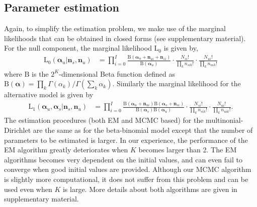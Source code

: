 \documentclass[11pt]{article}
\begin{document}
\subsection{Parameter estimation}
Again, to simplify the estimation problem, we make use of the marginal likelihoods that can be obtained in closed forms (see supplementary material). For the null component, the marginal likelihood $\mathrm{L}_0$ is given by,
\begin{align}
\mathrm{L}_0(\boldsymbol{\alpha}_u|\mathbf{n}_s,\mathbf{n}_u) &= \prod_{i=0}^I\frac{ \mathrm{B}(\boldsymbol{\alpha}_{u}+\mathbf{n}_{ui}+\mathbf{n}_{si})}{\mathrm{B}(\boldsymbol{\alpha}_u)} \cdot \frac{N_{si}!}{\prod_k n_{sik}!} \cdot \frac{N_{ui}!}{\prod_k n_{uik}!}
\end{align}
where $\mathrm{B}$ is the $2^K$-dimensional Beta function defined as $\mathrm{B}(\boldsymbol{\alpha})=\prod_k\Gamma(\alpha_k)/\Gamma(\sum_k\alpha_k)$. Similarly the marginal likelihood for the alternative model is given by 
\begin{align}
\mathrm{L}_1(\boldsymbol{\alpha}_u,\boldsymbol{\alpha}_s|\mathbf{n}_s,\mathbf{n}_u) &= \prod_{i=0}^I\frac{\mathrm{B}(\boldsymbol{\alpha}_{u}+\mathbf{n}_{ui}) \mathrm{B}(\boldsymbol{\alpha}_{s}+\mathbf{n}_{si})}{\mathrm{B}(\boldsymbol{\alpha}_s)\mathrm{B}(\boldsymbol{\alpha}_u)} \cdot \frac{N_{si}!}{\prod_k n_{sik}!} \cdot \frac{N_{ui}!}{\prod_k n_{uik}!}.\label{eq:postmult}
\end{align}
The estimation procedures (both EM and MCMC based) for the multinonial-Dirichlet are the same as for the beta-binomial model except that the number of parameters to be estimated is larger. In our experience, the performance of the EM algorithm greatly deteriorates when $K$ becomes larger than 2. The EM algorithms becomes very dependent on the initial values, and can even fail to converge when good initial values are provided. Although our MCMC algorithm is slightly more computational, it does not suffer from this problem and can be used even when $K$ is large. More details about both algorithms are given in supplementary material. 
\end{document}
